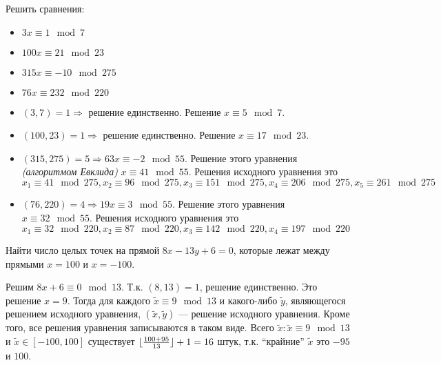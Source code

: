 

\cfoot{}



\begin{exercise}
    Решить сравнения:
    \begin{itemize}
        \item \(3x \equiv 1 \mod 7\)
        \item \(100x \equiv 21 \mod 23\)
        \item \(315x \equiv - 10 \mod 275\)
        \item \(76x \equiv 232 \mod 220\)
    \end{itemize}
\end{exercise}
\begin{solution}\itemfix
    \begin{itemize}
        \item \((3, 7) = 1 \Rightarrow\) решение единственно. Решение \(x \equiv 5 \mod 7\).
        \item \((100, 23) = 1 \Rightarrow\) решение единственно. Решение \(x \equiv 17 \mod 23\).
        \item \((315, 275) = 5 \Rightarrow 63x \equiv - 2 \mod 55\). Решение этого уравнения \textit{(алгоритмом Евклида)} \(x \equiv 41 \mod 55\). Решения исходного уравнения это \(x_1 \equiv 41 \mod 275, x_2 \equiv 96 \mod 275, x_3 \equiv 151 \mod 275, x_4 \equiv 206 \mod 275, x_5 \equiv 261 \mod 275\)
        \item \((76, 220) = 4 \Rightarrow 19x \equiv 3 \mod 55\). Решение этого уравнения \(x \equiv 32 \mod 55\). Решения исходного уравнения это \(x_1 \equiv 32 \mod 220, x_2 \equiv 87 \mod 220, x_3 \equiv 142 \mod 220, x_4 \equiv 197 \mod 220\)
    \end{itemize}
\end{solution}

\begin{exercise}
    Найти число целых точек на прямой \(8x - 13y + 6 = 0\), которые лежат между прямыми \(x = 100\) и \(x = -100\).
\end{exercise}
\begin{solution}
    Решим \(8x + 6 \equiv 0 \mod 13\). Т.к. \((8, 13) = 1\), решение единственно. Это решение \(x = 9\). Тогда для каждого \(\tilde{x} \equiv 9 \mod 13\) и какого-либо \(\tilde{y}\), являющегося решением исходного уравнения, \((\tilde{x}, \tilde{y})\) --- решение исходного уравнения. Кроме того, все решения уравнения записываются в таком виде. Всего \(\tilde{x} : \tilde{x} \equiv 9 \mod 13\) и \(\tilde{x} \in [ - 100, 100]\) существует \(\lfloor\frac{100 + 95}{13}\rfloor + 1 = 16\) штук, т.к. ``крайние'' \(\tilde{x}\) это \( - 95\) и \(100\).
\end{solution}

